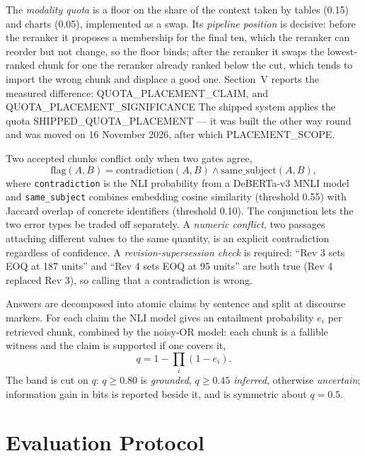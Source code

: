 \documentclass[conference]{IEEEtran}
\begin{document}
The \emph{modality quota} is a floor on the share of the context taken by
tables (0.15) and charts (0.05), implemented as a swap. Its
\emph{pipeline position} is decisive: before the reranker it proposes a
membership for the final ten, which the reranker can reorder but not change,
so the floor binds; after the reranker it swaps the lowest-ranked chunk for
one the reranker already ranked below the cut, which tends to import the
wrong chunk and displace a good one. Section~V reports the measured
difference: {{QUOTA_PLACEMENT_CLAIM}}, and
{{QUOTA_PLACEMENT_SIGNIFICANCE}} The
shipped system applies the quota {{SHIPPED_QUOTA_PLACEMENT}} --- it was built
the other way round and was moved on 16 November 2026, after which
{{PLACEMENT_SCOPE}}.

Two accepted chunks conflict only when two gates agree,
\begin{equation}
\mathrm{flag}(A,B)=\mathrm{contradiction}(A,B)\wedge\mathrm{same\_subject}(A,B),
\label{eq:flag}
\end{equation}
where \texttt{contradiction} is the NLI probability from a DeBERTa-v3 MNLI
model and \texttt{same\_subject} combines embedding cosine similarity
(threshold 0.55) with Jaccard overlap of concrete identifiers (threshold
0.10). The conjunction lets the two error types be traded off separately. A
\emph{numeric conflict}, two passages attaching different values to the same
quantity, is an explicit contradiction regardless of confidence. A
\emph{revision-supersession check} is required: ``Rev 3 sets EOQ at 187 units''
and ``Rev 4 sets EOQ at 95 units'' are both true (Rev 4 replaced Rev 3), so
calling that a contradiction is wrong.

Answers are decomposed into atomic claims by sentence and split at discourse
markers. For each claim the NLI model gives an entailment probability $e_i$
per retrieved chunk, combined by the noisy-OR model: each chunk is a fallible
witness and the claim is supported if one covers it,
\begin{equation}
q = 1-\prod_i (1-e_i).
\label{eq:noisyor}
\end{equation}
The band is cut on $q$: $q\geq0.80$ is \emph{grounded}, $q\geq0.45$
\emph{inferred}, otherwise \emph{uncertain}; information gain in bits is
reported beside it, and is symmetric about $q=0.5$.

\section{Evaluation Protocol}
\label{sec:protocol}
\end{document}
